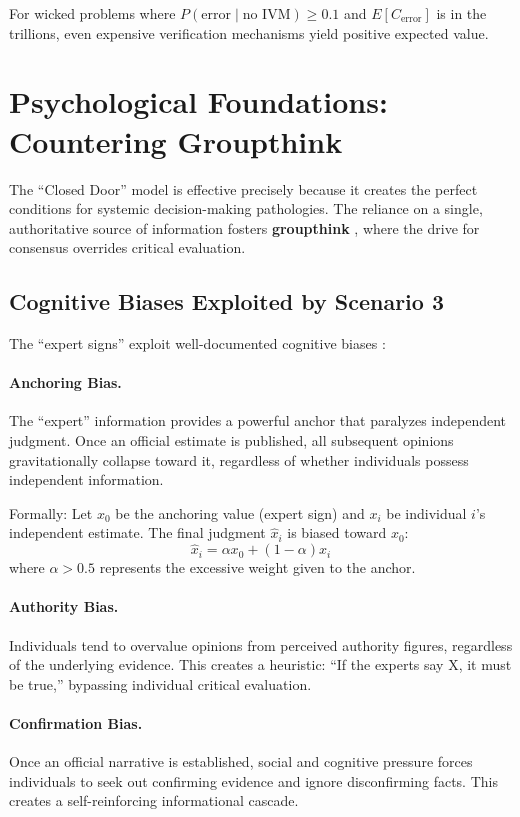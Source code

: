 \documentclass[11pt,a4paper]{article}
\begin{document}
For wicked problems where $P(\text{error} \mid \text{no IVM}) \geq 0.1$ and $E[C_{\text{error}}]$ is in the trillions, even expensive verification mechanisms yield positive expected value.

\section{Psychological Foundations: Countering Groupthink}

The ``Closed Door'' model is effective precisely because it creates the perfect conditions for systemic decision-making pathologies. The reliance on a single, authoritative source of information fosters \textbf{groupthink} \citep{Janis1982}, where the drive for consensus overrides critical evaluation.

\subsection{Cognitive Biases Exploited by Scenario 3}

The ``expert signs'' exploit well-documented cognitive biases \citep{Kahneman2011}:

\paragraph{Anchoring Bias.} The ``expert'' information provides a powerful anchor that paralyzes independent judgment. Once an official estimate is published, all subsequent opinions gravitationally collapse toward it, regardless of whether individuals possess independent information.

Formally: Let $x_0$ be the anchoring value (expert sign) and $x_i$ be individual $i$'s independent estimate. The final judgment $\hat{x}_i$ is biased toward $x_0$:
\begin{equation}
\hat{x}_i = \alpha x_0 + (1-\alpha) x_i
\end{equation}
where $\alpha > 0.5$ represents the excessive weight given to the anchor.

\paragraph{Authority Bias.} Individuals tend to overvalue opinions from perceived authority figures, regardless of the underlying evidence. This creates a heuristic: ``If the experts say X, it must be true,'' bypassing individual critical evaluation.

\paragraph{Confirmation Bias.} Once an official narrative is established, social and cognitive pressure forces individuals to seek out confirming evidence and ignore disconfirming facts. This creates a self-reinforcing informational cascade.
\end{document}
